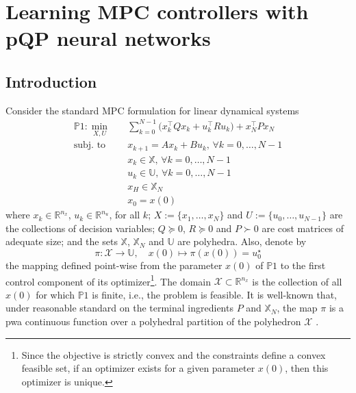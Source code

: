 \cleardoublepage
\chapter{Learning MPC controllers with pQP neural networks}

\section{Introduction}
\label{sec.chap4_intro}

Consider the standard MPC formulation for linear dynamical systems
\begin{subequations}
	\label{eq:linearmpc}
	\begin{align}
		\mathds{P}1: \min_{X,U} \quad & \sum_{k=0}^{N-1} \big( x_k^\top Q x_k + u_k^\top R u_k \big) + x_N^\top P x_N \label{eq.MPC_classical_cost}\\
		\text{subj. to} \quad 
		& x_{k+1} = A x_{k} + B u_{k}, \, \forall k = 0,\dots,N-1  \\
		& x_{k} \in \mathbb{X}, \, \forall k = 0,\dots,N-1 \\
		& u_{k} \in \mathbb{U}, \, \forall k = 0,\dots,N-1 \\
		& x_{H} \in \mathbb{X}_N \\
		& x_0 = x(0)
	\end{align}
\end{subequations}
where $x_k \in \mathbb{R}^{n_x}$, $u_k \in \mathbb{R}^{n_u}$, for all $k$; $X:=\{x_1,\dots,x_{N}\}$ and $U:=\{u_0,\dots,u_{N-1}\}$ are the collections of decision variables; $Q \succeq 0$, $R \succeq 0$ and $P \succ 0$ are cost matrices of adequate size; and the sets $\mathbb{X}$, $\mathbb{X}_N$ and $\mathbb{U}$ are polyhedra. Also, denote by 
\begin{equation}
	\pi: \mathcal{X} \rightarrow \mathbb{U}, \quad x(0) \mapsto \pi(x(0)) = u_0^\star
\end{equation} 
the mapping defined point-wise from the parameter $x(0)$ of $\mathds{P}1$ to the first control component of its optimizer\footnote{Since the objective is strictly convex and the constraints define a convex feasible set, if an optimizer exists for a given parameter $x(0)$, then this optimizer is unique.}. The domain $\mathcal{X} \subset \mathbb{R}^{n_x}$ is the collection of all $x(0)$ for which $\mathds{P}1$ is finite, i.e., the problem is feasible. It is well-known that, under reasonable standard on the terminal ingredients $P$ and $\mathbb{X}_N$, the map $\pi$ is a \ac{pwa} continuous function over a polyhedral partition of the polyhedron $\mathcal{X}$ \citep{bemporad2002explicit,borrelli2017predictive}. 

